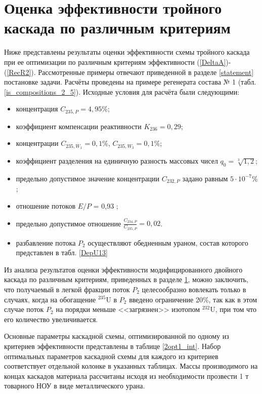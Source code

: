 \section{Оценка эффективности тройного каскада по различным критериям}\label{MDKefficiency}

Ниже представлены результаты оценки эффективности схемы тройного каскада при ее оптимизации по различным критериям эффективности (\ref{DeltaA})-(\ref{RecR2}). Рассмотренные примеры отвечают приведенной в разделе \ref{statement} постановке задачи. Расчёты проведены на примере регенерата состава № 1  (табл. \ref{is_compositions_2_5}). Исходные условия для расчёта были следующими:

\begin{itemize}
    \item концентрация $C_{235,{P}} = {4,95\%}$; 
    \item коэффициент компенсации реактивности $K_{236}=0,29$;
    \item концентрации $C_{235,{W_1}} = 0,1\%$, $C_{235,{W_3}} = 0,1\%$;
    \item коэффициент разделения на единичную разность массовых чисел $q_{0} = \sqrt[3]{1,2}$;
    \item предельно допустимое значение концентрации $C_{232,{P}}$ задано равным $5\cdot10^{-7} \%$;
    \item отношение потоков $E/P$ = 0,93 ;
    \item предельно допустимое отношение $\frac{C_{234,{P}}}{C_{235,{P}}} = 0,02$.
    \item разбавление потока $P_2$ осуществляют обедненным ураном, состав которого представлен в табл. \ref{DepU13}
\end{itemize}

Из анализа результатов оценки эффективности модифицированного двойного каскада по различным критериям, приведенных в разделе \ref{MDKefficiency}, можно заключить, что получаемый в легкой фракции поток $P_2$ целесообразно вовлекать только в случаях, когда на обогащение $^{235}$U в $P_2$ введено ограничение 20\%, так как в этом случае поток $P_2$ на порядки меньше <<загрязнен>> изотопом $^{232}$U, при том что его количество увеличивается.

Основные параметры каскадной схемы, оптимизированной по одному из критериев эффективности представлены в таблице \ref{2opt1_int}.
Набор оптимальных параметров каскадной схемы для каждого из критериев соответствует отдельной колонке в указанных таблицах. 
Массы производимого на концах каскадов материала рассчитаны исходя из необходимости прозвести 1 т товарного НОУ в виде металлического урана.

